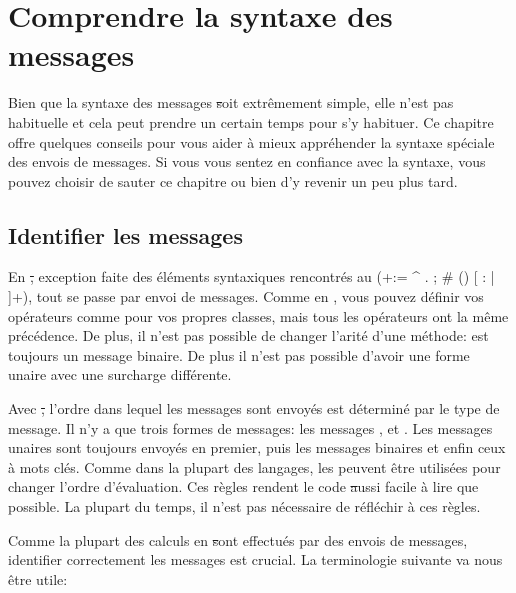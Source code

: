 \documentclass[a4paper,10pt,twoside]{book}
\begin{document}
	\renewcommand{\nnbb}[2]{} %
	\sloppy
\fi
\chapter{Comprendre la syntaxe des messages}
\label{cha:understanding}

Bien que la syntaxe des messages \st soit extr\^emement simple, elle n'est pas habituelle et cela peut prendre un certain temps pour s'y habituer. Ce chapitre offre quelques conseils pour vous aider \`a mieux appr\'ehender la syntaxe sp\'eciale des envois de messages.
Si vous vous sentez en confiance avec la syntaxe, vous pouvez choisir de sauter ce chapitre ou bien d'y revenir un peu plus tard.


\section{Identifier les messages}

En \st, exception faite des \'el\'ements syntaxiques rencontr\'es au
 (\ct+:= ^ . ; # () {} [ : | ]+), tout se passe par envoi de messages.
Comme en , vous pouvez d\'efinir vos op\'erateurs comme \ct{+} pour vos propres classes, mais tous les op\'erateurs ont la m\^eme pr\'ec\'edence.
De plus, il n'est pas possible de changer l'arit\'e d'une m\'ethode:
\ct{-} est toujours un message binaire. De plus il n'est pas possible
d'avoir une forme unaire avec une surcharge diff\'erente.

Avec \st, l'ordre dans lequel les messages sont envoy\'es est
d\'etermin\'e par le type de message. Il n'y a que trois formes de
messages: les messages ,  et . Les messages unaires sont toujours envoy\'es en premier, puis les messages binaires et enfin ceux \`a mots cl\'es. Comme dans la plupart des langages,  les  peuvent \^etre utilis\'ees pour changer l'ordre d'\'evaluation. Ces r\`egles rendent le code \st aussi facile \`a lire que possible. La plupart du temps, il n'est pas n\'ecessaire de r\'efl\'echir \`a ces r\`egles.

Comme la plupart des calculs en \st sont effectu\'es par des envois de messages, identifier correctement les messages est crucial. La terminologie suivante va nous \^etre utile:
\end{document}
